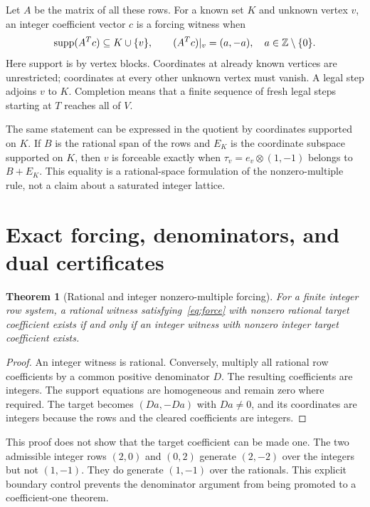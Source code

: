 \documentclass[11pt,letterpaper]{article}
\newtheorem{theorem}{Theorem}[section]
\theoremstyle{definition}
\theoremstyle{remark}\newtheorem{remark}[theorem]{Remark}
\newcommand{\supp}{\operatorname{supp}}\newcommand{\diag}{\operatorname{diag}}
\begin{document}
Let $A$ be the matrix of all these rows. For a known set $K$ and unknown vertex $v$, an integer coefficient vector $c$ is a forcing witness when
\begin{equation}\label{eq:force}
\supp(A^Tc)\subseteq K\cup\{v\},\qquad
(A^Tc)|_v=(a,-a),\quad a\in\Z\setminus\{0\}.
\end{equation}
Here support is by vertex blocks. Coordinates at already known vertices are unrestricted; coordinates at every other unknown vertex must vanish. A legal step adjoins $v$ to $K$. Completion means that a finite sequence of fresh legal steps starting at $T$ reaches all of $V$.

The same statement can be expressed in the quotient by coordinates supported on $K$. If $B$ is the rational span of the rows and $E_K$ is the coordinate subspace supported on $K$, then $v$ is forceable exactly when $\tau_v=e_v\otimes(1,-1)$ belongs to $B+E_K$. This equality is a rational-space formulation of the nonzero-multiple rule, not a claim about a saturated integer lattice.

\section{Exact forcing, denominators, and dual certificates}
\begin{theorem}[Rational and integer nonzero-multiple forcing]\label{thm:denom}
For a finite integer row system, a rational witness satisfying~\eqref{eq:force} with nonzero rational target coefficient exists if and only if an integer witness with nonzero integer target coefficient exists.
\end{theorem}
\begin{proof}
An integer witness is rational. Conversely, multiply all rational row coefficients by a common positive denominator $D$. The resulting coefficients are integers. The support equations are homogeneous and remain zero where required. The target becomes $(Da,-Da)$ with $Da\ne0$, and its coordinates are integers because the rows and the cleared coefficients are integers.
\end{proof}
This proof does not show that the target coefficient can be made one. The two admissible integer rows $(2,0)$ and $(0,2)$ generate $(2,-2)$ over the integers but not $(1,-1)$. They do generate $(1,-1)$ over the rationals. This explicit boundary control prevents the denominator argument from being promoted to a coefficient-one theorem.
\end{document}
